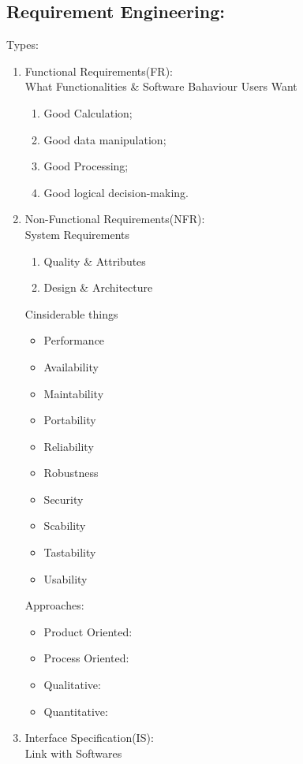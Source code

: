 \documentclass{article}
\begin{document}
		\subsection{Requirement Engineering:}
		Types:
		\begin{enumerate}
			\item Functional Requirements(FR):
			\\What Functionalities \& Software Bahaviour Users Want
			\begin{enumerate}
				\item Good Calculation;
				\item Good data manipulation;
				\item Good Processing;
				\item Good logical decision-making.
			\end{enumerate}
			\item Non-Functional Requirements(NFR):
			\\System Requirements
			\begin{enumerate}
				\item Quality \& Attributes
				\item Design \& Architecture
			\end{enumerate}
			Cinsiderable things
			\begin{itemize}
				\item Performance
				\item Availability
				\item Maintability
				\item Portability
				\item Reliability
				\item Robustness
				\item Security
				\item Scability
				\item Tastability
				\item Usability
			\end{itemize}
			Approaches:
			\begin{itemize}
				\item Product Oriented:
				\item Process Oriented:
				\item Qualitative:
				\item Quantitative:
			\end{itemize}
			\item Interface Specification(IS):
			\\Link with Softwares
			\begin{itemize}

\end{itemize}
\end{enumerate}
\end{document}
